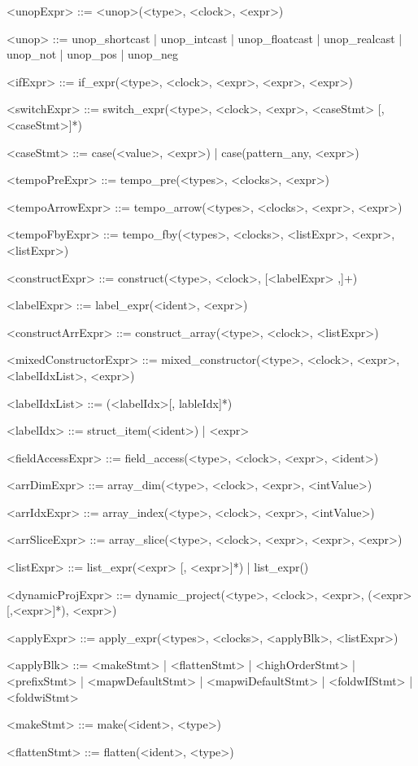 \documentclass{article}
\begin{document}
\begin{grammar}
<unopExpr> ::= <unop>(<type>, <clock>, <expr>)

<unop> ::= unop_shortcast | unop_intcast | unop_floatcast |
           unop_realcast | unop_not | unop_pos | unop_neg

<ifExpr> ::= if_expr(<type>, <clock>, <expr>, <expr>, <expr>)

<switchExpr> ::= switch_expr(<type>, <clock>, <expr>, <caseStmt> [,<caseStmt>]*)

<caseStmt> ::= case(<value>, <expr>) | case(pattern_any, <expr>)

<tempoPreExpr> ::= tempo_pre(<types>, <clocks>, <expr>)

<tempoArrowExpr> ::= tempo_arrow(<types>, <clocks>, <expr>, <expr>)

<tempoFbyExpr> ::= tempo_fby(<types>, <clocks>, <listExpr>, <expr>, <listExpr>)

<constructExpr> ::= construct(<type>, <clock>, [<labelExpr> ,]+)

<labelExpr> ::= label_expr(<ident>, <expr>)

<constructArrExpr> ::= construct_array(<type>, <clock>, <listExpr>)

<mixedConstructorExpr> ::= mixed_constructor(<type>, <clock>, <expr>, <labelIdxList>, <expr>)

<labelIdxList> ::= (<labelIdx>[, lableIdx]*)

<labelIdx> ::= struct_item(<ident>) | <expr>

<fieldAccessExpr> ::= field_access(<type>, <clock>, <expr>, <ident>)

<arrDimExpr> ::= array_dim(<type>, <clock>, <expr>, <intValue>)

<arrIdxExpr> ::= array_index(<type>, <clock>, <expr>, <intValue>)

<arrSliceExpr> ::= array_slice(<type>, <clock>, <expr>, <expr>, <expr>)

<listExpr> ::= list_expr(<expr> [, <expr>]*) | list_expr()

<dynamicProjExpr> ::= dynamic_project(<type>, <clock>, <expr>, (<expr> [,<expr>]*), <expr>)

<applyExpr> ::= apply_expr(<types>, <clocks>, <applyBlk>, <listExpr>)

<applyBlk> ::= <makeStmt> | <flattenStmt> | <highOrderStmt> | <prefixStmt> |
               <mapwDefaultStmt> | <mapwiDefaultStmt> |
               <foldwIfStmt> | <foldwiStmt>

<makeStmt> ::= make(<ident>, <type>)

<flattenStmt> ::= flatten(<ident>, <type>)


\end{grammar}
\end{document}
